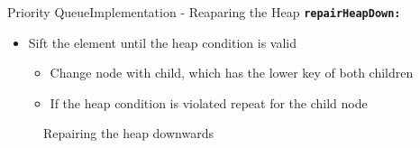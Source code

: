 \begin{frame}{Priority Queue}{Implementation - Reaparing the Heap}
  {\color{Mittel-Blau}\texttt{\textbf{repairHeapDown:}}}
  \begin{itemize}
    \item
      {\color{Mittel-Blau}Sift} the element until the
      {\color{Mittel-Blau}heap condition} is valid
      \begin{itemize}
        \item
          Change node with child, which has the lower key of both children
        \item
          If the {\color{Mittel-Blau}heap condition} is violated repeat for
          the child node
      \end{itemize}
  \end{itemize}
  \begin{center}
    \begin{figure}[!h]%
      \begin{columns}%
        \begin{column}{0.45\textwidth}%
          \begin{minipage}{\textwidth}%
            \begin{center}%
            \end{center}%
          \end{minipage}%
        \end{column}%
        \begin{column}{0.45\textwidth}%
          \begin{minipage}{\textwidth}%
            \begin{center}%
            \end{center}%
          \end{minipage}%
        \end{column}%
      \end{columns}%
      \caption{Repairing the heap downwards}%
      \label{fig:priority_queue:impl_repair_heap_down}%
    \end{figure}
  \end{center}
\end{frame}


